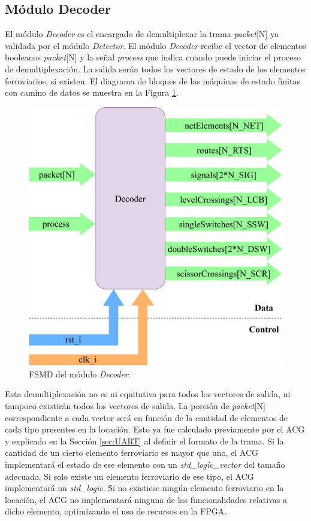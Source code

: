 \subsection{Módulo Decoder}
	\label{sec:decoder}
	
	El módulo \textit{Decoder} es el encargado de demultiplexar la trama \textit{packet}[N] ya validada por el módulo \textit{Detector}. El módulo \textit{Decoder} recibe el vector de elementos booleanos \textit{packet}[N] y la señal \textit{process} que indica cuando puede iniciar el proceso de demultiplexación. La salida serán todos los vectores de estado de los elementos ferroviarios, si existen. El diagrama de bloques de las máquinas de estado finitas con camino de datos se muestra en la Figura \ref{fig:Decoder_module}.
	
	\begin{figure}[H]
		\centering
		\includegraphics[width=1\textwidth]{Figuras/Decoder_module.png}
		\centering\caption{FSMD del módulo \textit{Decoder}.}
		\label{fig:Decoder_module}
	\end{figure}
	
	Esta demultiplexación no es ni equitativa para todos los vectores de salida, ni tampoco existirán todos los vectores de salida. La porción de \textit{packet}[N] correspondiente a cada vector será en función de la cantidad de elementos de cada tipo presentes en la locación. Esto ya fue calculado previamente por el ACG y explicado en la Sección \ref{sec:UART} al definir el formato de la trama. Si la cantidad de un cierto elemento ferroviario es mayor que uno, el ACG implementará el estado de ese elemento con un \textit{std\_logic\_vector} del tamaño adecuado. Si solo existe un elemento ferroviario de ese tipo, el ACG implementará un \textit{std\_logic}. Si no existiese ningún elemento ferroviario en la locación, el ACG no implementará ninguna de las funcionalidades relativas a dicho elemento, optimizando el uso de recursos en la FPGA.